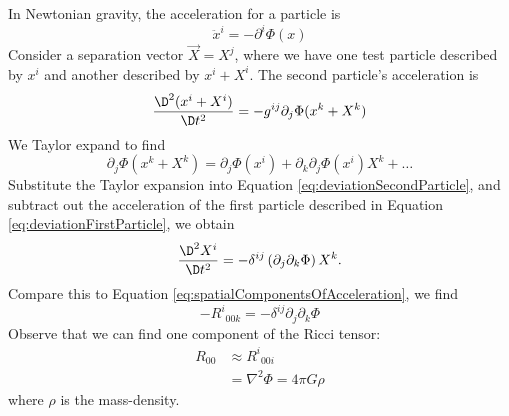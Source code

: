In Newtonian gravity, the acceleration for a particle is
\begin{equation}\label{eq:deviationFirstParticle}
\ddot{x}^{i}=-\partial^{i}\Phi(x)
\end{equation}
Consider a separation vector $\vec{X}=X^{j}$, where we have
one test particle described by $x^{i}$ and another described by
$x^{i}+X^{i}$. The second particle's acceleration is
\begin{equation}\label{eq:deviationSecondParticle}
\frac{\D^{2}(x^i+X^i)}{\D
  t^{2}}=-g^{ij}\partial_{j}\Phi(x^{k}+X^k)
\end{equation}
We Taylor expand to find
\begin{equation}
\partial_{j}\Phi(x^{k}+X^k)=\partial_{j}\Phi(x^i)
+\partial_{k}\partial_{j}\Phi(x^{i})X^{k}+\dots
\end{equation}
Substitute the Taylor expansion into Equation
\eqref{eq:deviationSecondParticle}, and subtract out the
acceleration of the first particle described in Equation
\eqref{eq:deviationFirstParticle}, we obtain
\begin{equation}
\frac{\D^{2}X^{i}}{\D t^{2}}=-\delta^{ij}\left(\partial_{j}\partial_{k}\Phi\right)X^{k}.
\end{equation}
Compare this to Equation
\eqref{eq:spatialComponentsOfAcceleration}, we find
\begin{equation}
-{R^{i}}_{00k}=-\delta^{ij}\partial_{j}\partial_{k}\Phi
\end{equation}
Observe that we can find one component of the Ricci tensor:
\begin{equation}
\begin{split}
R_{00} &\approx {R^{i}}_{00i}\\
&=\nabla^{2}\Phi=4\pi G\rho
\end{split}
\end{equation}
where $\rho$ is the mass-density.

